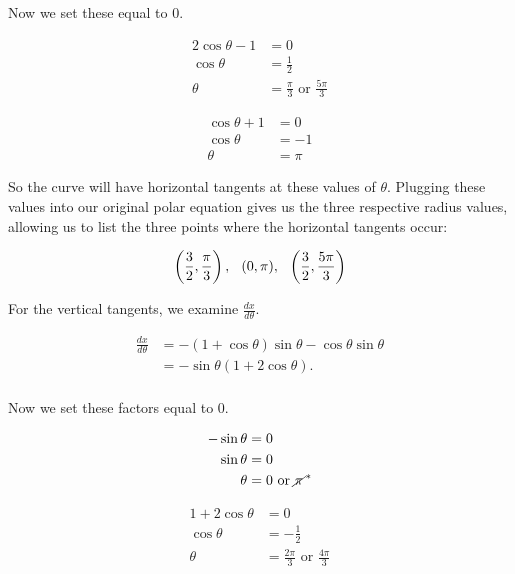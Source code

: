 \documentclass[12pt,oneside,english]{amsart}
\begin{document}
\begin{enumerate}[leftmargin=*]
\begin{enumerate}
Now we set these equal to 0.

\begin{multicols}{2}

\begin{align*}
2\cos\theta-1&=0 \\
\cos\theta&=\frac{1}{2} \\
\theta&=\frac{\pi}{3}\text{ or }\frac{5\pi}{3}
\end{align*}

\columnbreak

\begin{align*}
\cos\theta+1&=0 \\
\cos\theta&=-1 \\
\theta&=\pi
\end{align*}

\end{multicols}

So the curve will have horizontal tangents at these values of $\theta$. Plugging these values into our original polar equation gives us the three respective radius values, allowing us to list the three points where the horizontal tangents occur:

\[
\left(\frac{3}{2},\frac{\pi}{3}\right),\hspace{0.25cm}(0,\pi),\hspace{0.25cm}\left(\frac{3}{2},\frac{5\pi}{3}\right)
\]

For the vertical tangents, we examine $\frac{dx}{d\theta}$.

\begin{align*}
\frac{dx}{d\theta}&=-(1+\cos\theta)\sin\theta-\cos\theta\sin\theta \\
&=-\sin\theta(1+2\cos\theta). \\
\end{align*}

Now we set these factors equal to 0.

\begin{multicols}{2}

\begin{align*}
-\sin\theta&=0 \\
\sin\theta&=0 \\
\theta&=0\text{ or }\cancel{\pi}\,^*
\end{align*}

\columnbreak

\begin{align*}
1+2\cos\theta&=0 \\
\cos\theta&=-\frac{1}{2} \\
\theta&=\frac{2\pi}{3}\text{ or }\frac{4\pi}{3}
\end{align*}


\end{multicols}
\end{enumerate}
\end{enumerate}
\end{document}
